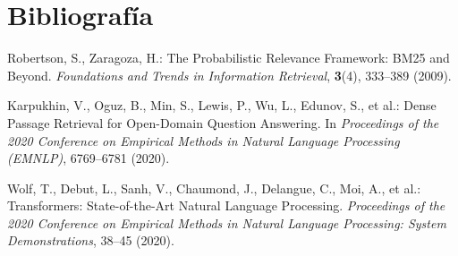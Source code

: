 \documentclass[runningheads]{llncs}
\begin{document}
\section{Bibliografía}
\begin{thebibliography}{8}
Robertson, S., Zaragoza, H.: The Probabilistic Relevance Framework: BM25 and Beyond. \emph{Foundations and Trends in Information Retrieval}, \textbf{3}(4), 333--389 (2009).

Karpukhin, V., Oguz, B., Min, S., Lewis, P., Wu, L., Edunov, S., et al.: Dense Passage Retrieval for Open-Domain Question Answering. In \emph{Proceedings of the 2020 Conference on Empirical Methods in Natural Language Processing (EMNLP)}, 6769--6781 (2020).

Wolf, T., Debut, L., Sanh, V., Chaumond, J., Delangue, C., Moi, A., et al.: Transformers: State-of-the-Art Natural Language Processing. \emph{Proceedings of the 2020 Conference on Empirical Methods in Natural Language Processing: System Demonstrations}, 38--45 (2020).

\end{thebibliography}
\end{document}

